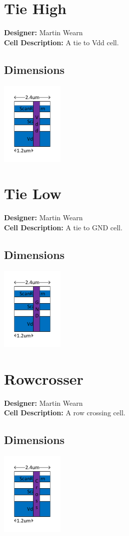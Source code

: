 \newpage

\begin{multicols}{2}
\section{Tie High}
\makebox[\linewidth]{\rule{0.5\textwidth}{0.4pt}}
{\bf Designer: } Martin Wearn\\
{\bf Cell Description: } A tie to Vdd cell.\\
\subsection*{Dimensions}\includegraphics[width=\textwidth,height=4cm,keepaspectratio=true]{../tiehigh/blackbox.pdf}

\section{Tie Low}
\makebox[\linewidth]{\rule{0.5\textwidth}{0.4pt}} 
{\bf Designer: } Martin Wearn\\
{\bf Cell Description: } A  tie to GND cell.\\
\subsection*{Dimensions}\includegraphics[width=\textwidth,height=4cm,keepaspectratio=true]{../tielow/blackbox.pdf}
\end{multicols}

\section{Rowcrosser} \makebox[\linewidth]{\rule{\textwidth}{0.4pt}}
{\bf Designer: } Martin Wearn\\
{\bf Cell Description: } A row crossing cell.\\
\subsection*{Dimensions}\includegraphics[width=\textwidth,height=4cm,keepaspectratio=true]{../rowcrosser/blackbox.pdf}



